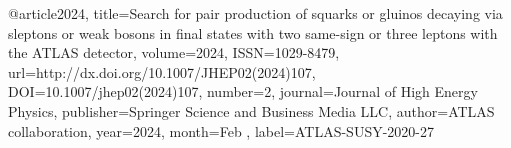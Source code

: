 @article{2024, 
    title={Search for pair production of squarks or gluinos decaying via sleptons or weak bosons in final states with two same-sign or three leptons with the ATLAS detector}, 
    volume={2024}, 
    ISSN={1029-8479}, 
    url={http://dx.doi.org/10.1007/JHEP02(2024)107}, 
    DOI={10.1007/jhep02(2024)107}, 
    number={2}, 
    journal={Journal of High Energy Physics}, 
    publisher={Springer Science and Business Media LLC}, 
    author={ATLAS collaboration}, 
    year={2024}, 
    month=Feb ,
    label={ATLAS-SUSY-2020-27}
}

